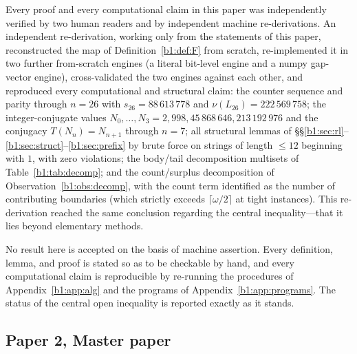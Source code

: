 \documentclass[a4paper]{article}
\theoremstyle{plain}
\theoremstyle{definition}
\theoremstyle{remark}
\begin{document}
Every proof and every computational claim in this paper was independently verified by two human readers and by independent machine re-derivations. An independent re-derivation, working only from the statements of this paper, reconstructed the map of Definition~\ref{b1:def:F} from scratch, re-implemented it in two further from-scratch engines (a literal bit-level engine and a numpy gap-vector engine), cross-validated the two engines against each other, and reproduced every computational and structural claim: the counter sequence and parity through $n=26$ with $s_{26}=88\,613\,778$ and $\nu(L_{26})=222\,569\,758$; the integer-conjugate values $N_0,\dots,N_3=2,998,45\,868\,646,213\,192\,976$ and the conjugacy $T(N_n)=N_{n+1}$ through $n=7$; all structural lemmas of \S\S\ref{b1:sec:rl}--\ref{b1:sec:struct}--\ref{b1:sec:prefix} by brute force on strings of length $\le 12$ beginning with $1$, with zero violations; the body/tail decomposition multisets of Table~\ref{b1:tab:decomp}; and the count/surplus decomposition of Observation~\ref{b1:obs:decomp}, with the count term identified as the number of contributing boundaries (which strictly exceeds $\lceil\omega/2\rceil$ at tight instances). This re-derivation reached the same conclusion regarding the central inequality---that it lies beyond elementary methods.

No result here is accepted on the basis of machine assertion. Every definition, lemma, and proof is stated so as to be checkable by hand, and every computational claim is reproducible by re-running the procedures of Appendix~\ref{b1:app:alg} and the programs of Appendix~\ref{b1:app:programs}. The status of the central open inequality is reported exactly as it stands.


\subsection{Paper 2, Master paper}
\end{document}
